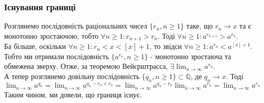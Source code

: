 \documentclass[a4paper, 14pt]{article}
\theoremstyle{theoremdd}
\theoremstyle{theoremdd}
\theoremstyle{theoremdd}
\theoremstyle{theoremdd}
\theoremstyle{theoremdd}
\theoremstyle{theoremdd}
\theoremstyle{theoremdd}
\theoremstyle{theoremdd}
\begin{document}
\subsubsection*{Існування границі}
\iffalse
Розглянемо послідовність раціональних чисел $q_n \to x$. Тоді за критерієм Коші,\\
$\forall \varepsilon > 0: \exists N_1: \forall m,n \geq N: |q_m-q_n| <\varepsilon$.\\
Зокрема якщо $\varepsilon = 1$, то тоді $\exists N_2: \forall m,n \geq N_2: |q_m-q_n| < 1$.\\
Тоді, зафіксувавши $N = \max\{N_1,N_2\}$, отримаємо ось таку оцінку $\forall n \geq N:$\\
$|a^{q_m}-a^{q_n}| = a^{q_m}|a^{q_m-q_n}-1| \leq a^{q_m} 2 |q_m-q_n|(a-1) \boxed{<} 2 a^C \varepsilon (a-1)$.\\
Додаткове пояснення: $q_n$ - збіжна послідовність, а тому - обмежена, тобто $|q_n| < C$. Беремо лише $C \in \mathbb{Q}$. А оскільки $a > 1$, то, $a^{q_n} < a^C$\\
Отже, дійсно, за критерієм Коші, $\exists \displaystyle\lim_{n \to \infty} a^{q_n}$.
\fi
Розглянемо послідовність раціональних чисел $\{r_n, n \geq 1\}$ таке, що $r_n \to x$ та є монотонно зростаючою, тобто $\forall n \geq 1: r_{n+1} > r_n$.
Тоді $\forall n \geq 1: a^{r_{n+1}} > a^{r_n}$.\\
Ба більше, оскільки $\forall n \geq 1: r_n < x < [x]+1$, то звідси $\forall n \geq 1: a^{r_n} < a^{[x]+1}$.\\
Тобто ми отримали послідовність $\{a^{r_n}, n \geq 1\}$ - монотонно зростаюча та обмежена зверху. Отже, за теоремою Вейєрштрасса, $\exists \displaystyle\lim_{n \to \infty} a^{r_n}$.
\bigskip \\
А тепер розглянемо довільну послідовність $\{q_n, n \geq 1\} \subset \mathbb{Q}$, де $q_n \to x$. Тоді \\ $\displaystyle\lim_{n \to \infty} a^{q_n} = \displaystyle\lim_{n \to \infty} a^{q_n-r_n+r_n} = \displaystyle\lim_{n \to \infty} a^{q_n-r_n} \displaystyle\lim_{n \to \infty} a^{r_n} = \lim_{n \to \infty} a^{r_n}$\\
Таким чином, ми довели, що границя існує.
\end{document}
